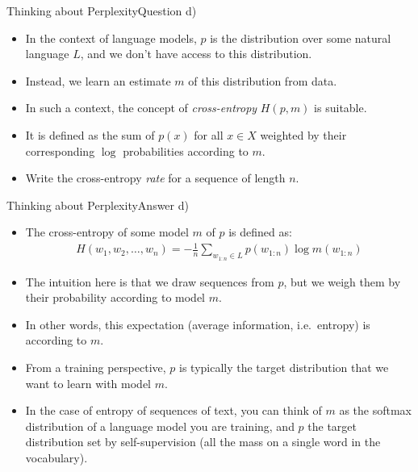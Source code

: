 \documentclass[t]{beamer}
\begin{document}
\begin{frame}{Thinking about Perplexity}{Question d)}
    \begin{itemize}
        \item In the context of language models, $p$ is the distribution over
              some natural language $L$, and we don't have access to this
              distribution.
        \item Instead, we learn an estimate $m$ of this distribution from data.
        \item In such a context, the concept of \emph{cross-entropy} $H(p,m)$ is
              suitable.
        \item It is defined as the sum of $p(x)$ for all $x\in X$ weighted by
              their corresponding $\log$ probabilities according to $m$.
        \item Write the cross-entropy \emph{rate} for a sequence of length $n$.
    \end{itemize}
\end{frame}

\begin{frame}{Thinking about Perplexity}{Answer d)}
    \begin{itemize}
        \item The cross-entropy of some model $m$ of $p$ is defined as:
              \begin{align*}
                  H(w_1,w_2,\ldots,w_n) = -\frac{1}{n}\sum_{w_{1:n}\in L} p(w_{1:n})\log m(w_{1:n})
              \end{align*}
        \item The intuition here is that we draw sequences from $p$, but we
              weigh them by their probability according to model $m$.
        \item In other words, this expectation (average information, i.e.\
              entropy) is according to $m$.
        \item From a training perspective, $p$ is typically the target
              distribution that we want to learn with model $m$.
        \item In the case of entropy of sequences of text, you can think of $m$
              as the softmax distribution of a language model you are training,
              and $p$ the target distribution set by self-supervision (all the
              mass on a single word in the vocabulary).
    \end{itemize}
\end{frame}
\end{document}
